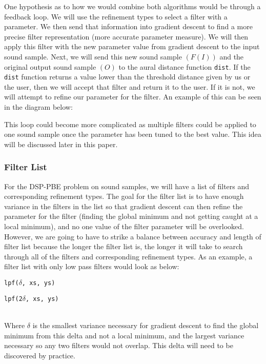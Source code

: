One hypothesis as to how we would combine both algorithms would be through a feedback loop. We will use the refinement types to select a filter with a parameter. We then send that information into gradient descent to find a more precise filter representation (more accurate parameter measure). We will then apply this filter with the new parameter value from gradient descent to the input sound sample. Next, we will send this new sound sample $(F(I))$ and the original output sound sample $(O)$ to the aural distance function \texttt{dist}. If the \texttt{dist} function returns a value lower than the threshold distance given by us or the user, then we will accept that filter and return it to the user. If it is not, we will attempt to refine our parameter for the filter. An example of this can be seen in the diagram below: 


This loop could become more complicated as multiple filters could be applied to one sound sample once the parameter has been tuned to the best value. This idea will be discussed later in this paper.

\subsubsection{Filter List}

For the DSP-PBE problem on sound samples, we will have a list of filters and corresponding refinement types. The goal for the filter list is to have enough variance in the filters in the list so that gradient descent can then refine the parameter for the filter (finding the global minimum and not getting caught at a local minimum), and no one value of the filter parameter will be overlooked. However, we are going to have to strike a balance between accuracy and length of filter list because the longer the filter list is, the longer it will take to search through all of the filters and corresponding refinement types. As an example, a filter list with only low pass filters would look as below:

\begin{enumerate}
{\setlength\itemindent{150pt} \item{\texttt{lpf($\delta$, xs, ys)}}}
{\setlength\itemindent{150pt} \item{\texttt{lpf(2$\delta$, xs, ys)}}}
\end{enumerate}
\centerline{\bm{$\vdots$}} ~\\
Where $\delta$ is the smallest variance necessary for gradient descent to find the global minimum from this delta and not a local minimum, and the largest variance necessary so any two filters would not overlap. This delta will need to be discovered by practice. 

